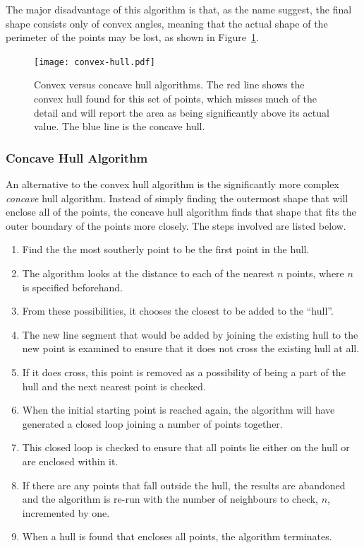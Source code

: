The major disadvantage of this algorithm is that, as the name suggest, the
final shape consists only of convex angles, meaning that the actual shape of
the perimeter of the points may be lost, as shown in
Figure~\ref{fig:convex-hull}.

\begin{figure}[tbh]
	\centering
	\texttt{[image: convex-hull.pdf]}

	\caption[Convex versus concave hull algorithms.]{Convex versus concave hull
		algorithms. The red line shows the convex hull found for this set of
		points, which misses much of the detail and will report the area as
		being significantly above its actual value. The blue line is the
		concave hull.}\label{fig:convex-hull}
\end{figure}

\subsubsection*{Concave Hull Algorithm}
\label{ssub:Concave Hull Algorithm}

An alternative to the convex hull algorithm is the significantly more complex
\emph{concave} hull algorithm\cite{moreira2007concave}. Instead of simply
finding the outermost shape that will enclose all of the points, the concave
hull algorithm finds that shape that fits the outer boundary of the points more
closely. The steps involved are listed below.

\begin{enumerate}
	\item Find the the most southerly point to be the first point in the hull.
	\item The algorithm looks at the distance to each of the nearest $n$
		points, where $n$ is specified beforehand.
	\item From these possibilities, it chooses the closest to be added to the
		``hull''.
	\item The new line segment that would be added by joining the existing hull
		to the new point is examined to ensure that it does not cross the
		existing hull at all.
	\item If it does cross, this point is removed as a possibility of being a
		part of the hull and the next nearest point is checked.
	\item When the initial starting point is reached again, the algorithm will
		have generated a closed loop joining a number of points together.
	\item This closed loop is checked to ensure that all points lie either on
		the hull or are enclosed within it.
	\item If there are any points that fall outside the hull, the results are
		abandoned and the algorithm is re-run with the number of neighbours to
		check, $n$, incremented by one.
	\item When a hull is found that encloses all points, the algorithm
		terminates.
\end{enumerate}

